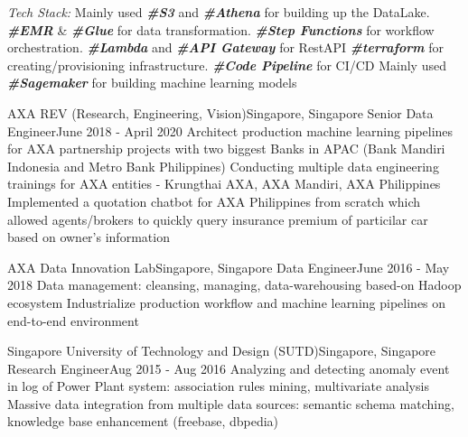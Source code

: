       \emph{Tech Stack:}
      \resumeItemListStart
          {Mainly used \textbf{\emph{\#S3}} and \textbf{\emph{\#Athena}} for building up the DataLake. \textbf{\emph{\#EMR}} \& \textbf{\emph{\#Glue}} for data transformation. \textbf{\emph{\#Step Functions}} for workflow orchestration. \textbf{\emph{\#Lambda}} and \textbf{\emph{\#API Gateway}} for RestAPI}
          {\textbf{\emph{\#terraform}} for creating/provisioning infrastructure. \textbf{\emph{\#Code Pipeline}} for CI/CD}
          {Mainly used \textbf{\emph{\#Sagemaker}} for building machine learning models}
      \resumeItemListEnd

    \resumeSubheading
      {AXA REV (Research, Engineering, Vision)}{Singapore, Singapore}
      {Senior Data Engineer}{June 2018 - April 2020}
      \resumeItemListStart
          {Architect production machine learning pipelines for AXA partnership projects with two biggest Banks in APAC (Bank Mandiri Indonesia and Metro Bank Philippines)}
          {Conducting multiple data engineering trainings for AXA entities - Krungthai AXA, AXA Mandiri, AXA Philippines}
          {Implemented a quotation chatbot for AXA Philippines from scratch which allowed agents/brokers to quickly query insurance premium of particilar car based on owner's information}
      \resumeItemListEnd

    \resumeSubheading
      {AXA Data Innovation Lab}{Singapore, Singapore}
      {Data Engineer}{June 2016 - May 2018}
      \resumeItemListStart
          {Data management: cleansing, managing, data-warehousing based-on Hadoop ecosystem}
          {Industrialize production workflow and machine learning pipelines on end-to-end environment}
      \resumeItemListEnd
    
    \resumeSubheading
      {Singapore University of Technology and Design (SUTD)}{Singapore, Singapore}
      {Research Engineer}{Aug 2015 - Aug 2016}
      \resumeItemListStart
          {Analyzing and detecting anomaly event in log of Power Plant system: association rules mining, multivariate analysis}
          {Massive data integration from multiple data sources: semantic schema matching, knowledge base enhancement (freebase, dbpedia)}
      \resumeItemListEnd

